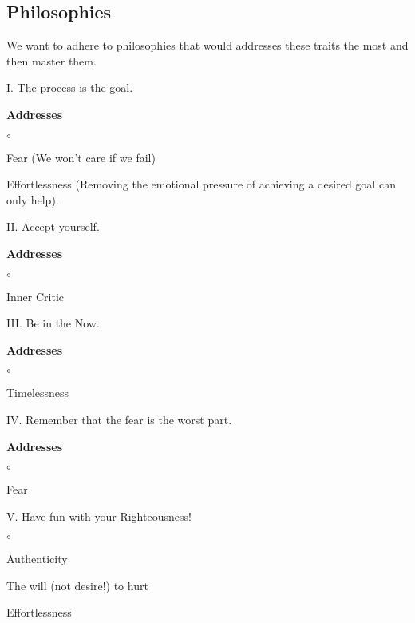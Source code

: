 \documentclass[12pt]{article}
\begin{document}
\pagebreak
\begin{samepage}
\section*{Philosophies}
We want to adhere to philosophies that would addresses these traits the most and then master them.  
\newline 

{\large I. The process is the goal.\par}

\textbf{Addresses}
\begin{list}{$\circ$}{}
	\item Fear (We won't care if we fail)
	\item Effortlessness (Removing the emotional pressure of achieving a desired goal can only help).  
\end{list}

\noindent\makebox[\linewidth]{\rule{\paperwidth}{0.4pt}}
\smallskip


{\large II. Accept yourself.\par}

\textbf{Addresses}
\begin{list}{$\circ$}{}
	\item Inner Critic
\end{list}

\noindent\makebox[\linewidth]{\rule{\paperwidth}{0.4pt}}
\smallskip

{\large III. Be in the Now.\par}

\textbf{Addresses}
\begin{list}{$\circ$}{}
	\item Timelessness
\end{list}

\noindent\makebox[\linewidth]{\rule{\paperwidth}{0.4pt}}

\smallskip
{\large IV. Remember that the fear is the worst part.\par}
\textbf{Addresses}
\begin{list}{$\circ$}{}
	\item Fear 
\end{list}


\noindent\makebox[\linewidth]{\rule{\paperwidth}{0.4pt}}

\smallskip
{\large V. Have fun with your Righteousness!}
\begin{list}{$\circ$}{}
	\item Authenticity
	\item The will (not desire!) to hurt
	\item Effortlessness 
\end{list}





\end{samepage}
\end{document}
